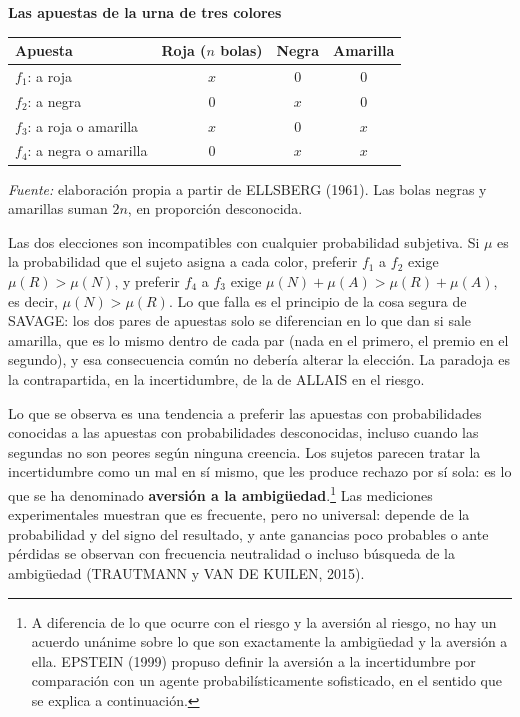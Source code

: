 \documentclass[10pt,a4paper]{article}
\begin{document}
\begin{center}\begin{minipage}{\linewidth}\centering
{\small\textbf{Las apuestas de la urna de tres colores}}\par\vspace{0.3em}
{\footnotesize\renewcommand{\arraystretch}{1.35}%
\begin{tabular}{|l|c|c|c|}
\hline
\textbf{Apuesta} & \textbf{Roja} ($n$ bolas) & \textbf{Negra} & \textbf{Amarilla} \tabularnewline\hline
$f_1$: a roja & $x$ & $0$ & $0$ \tabularnewline\hline
$f_2$: a negra & $0$ & $x$ & $0$ \tabularnewline\hline
$f_3$: a roja o amarilla & $x$ & $0$ & $x$ \tabularnewline\hline
$f_4$: a negra o amarilla & $0$ & $x$ & $x$ \tabularnewline\hline
\end{tabular}}\par\vspace{0.3em}
{\small\textit{Fuente: }elaboración propia a partir de ELLSBERG (1961). Las bolas negras y amarillas suman $2n$, en proporción desconocida.}
\end{minipage}\end{center}

Las dos elecciones son incompatibles con cualquier probabilidad subjetiva. Si $\mu$ es la probabilidad que el sujeto asigna a cada color, preferir $f_1$ a $f_2$ exige $\mu(R)>\mu(N)$, y preferir $f_4$ a $f_3$ exige $\mu(N)+\mu(A)>\mu(R)+\mu(A)$, es decir, $\mu(N)>\mu(R)$. Lo que falla es el principio de la cosa segura de SAVAGE: los dos pares de apuestas solo se diferencian en lo que dan si sale amarilla, que es lo mismo dentro de cada par (nada en el primero, el premio en el segundo), y esa consecuencia común no debería alterar la elección. La paradoja es la contrapartida, en la incertidumbre, de la de ALLAIS en el riesgo.

Lo que se observa es una tendencia a preferir las apuestas con probabilidades conocidas a las apuestas con probabilidades desconocidas, incluso cuando las segundas no son peores según ninguna creencia. Los sujetos parecen tratar la incertidumbre como un mal en sí mismo, que les produce rechazo por sí sola: es lo que se ha denominado \textbf{aversión a la ambigüedad}.\footnote{%
    A diferencia de lo que ocurre con el riesgo y la aversión al riesgo, no hay un acuerdo unánime sobre lo que son exactamente la ambigüedad y la aversión a ella. EPSTEIN (1999) propuso definir la aversión a la incertidumbre por comparación con un agente probabilísticamente sofisticado, en el sentido que se explica a continuación.
} Las mediciones experimentales muestran que es frecuente, pero no universal: depende de la probabilidad y del signo del resultado, y ante ganancias poco probables o ante pérdidas se observan con frecuencia neutralidad o incluso búsqueda de la ambigüedad (TRAUTMANN y VAN DE KUILEN, 2015).
\end{document}
